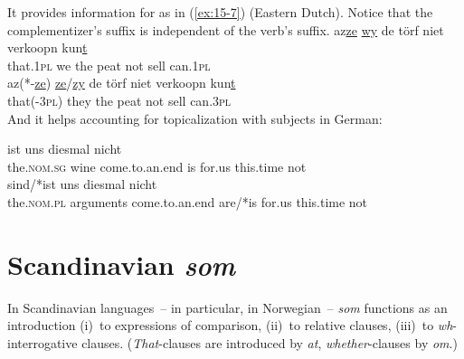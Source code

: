 \documentclass[output=paper]{LSP/langsci}
\begin{document}
\begin{exe}
\ex%
\label{ex:15-6}
\begin{xlist}
\end{xlist}
\end{exe}
\addlines
\randnum\label{rn:15-14}It provides information for  as in (\ref{ex:15-7}) (Eastern
Dutch). Notice that the complementizer's suffix is independent of the
verb's suffix.
\eal%
\settowidth{}
\label{ex:15-7}
\ex%
\label{ex:15-7a}
\gll az\underline{ze} \underline{wy} de törf niet verkoopn kun\underline{t} \\
     that.1\textsc{pl} we the peat not sell can.1\textsc{pl} \\
\ex%
\label{ex:15-7b}
\gll az(*-\underline{ze}) \underline{ze}/\underline{zy} de törf niet verkoopn kun\underline{t} \\
     that(-3\textsc{pl}) they the peat not sell can.3\textsc{pl} \\
\zl
{\randnum}And it helps accounting for  topicalization with  subjects in German:
\begin{exe}
\ex%
\label{ex:15-8}
\begin{xlist}
\ex%
\label{ex:15-8a}
 ist uns diesmal nicht \\
\spacebr{}the.\textsc{nom.sg} wine come.to.an.end is for.us this.time not \\
\ex%
\label{ex:15-8b}
 sind/*ist uns diesmal nicht \\
\spacebr{}the.\textsc{nom.pl} arguments come.to.an.end are/*is for.us this.time not \\
\end{xlist}
\end{exe}

\section{Scandinavian \textit{som}}
\randnum\label{rn:15-15}In Scandinavian languages~-- in particular, in
Norwegian~-- \textit{som} functions as an introduction (i)~to
expressions of comparison, (ii)~to relative clauses, (iii)~to
\emph{wh}-interrogative clauses. (\textit{That}-clauses are introduced by \textit{at},
\textit{whether}-clauses by \textit{om}.)
\end{document}
